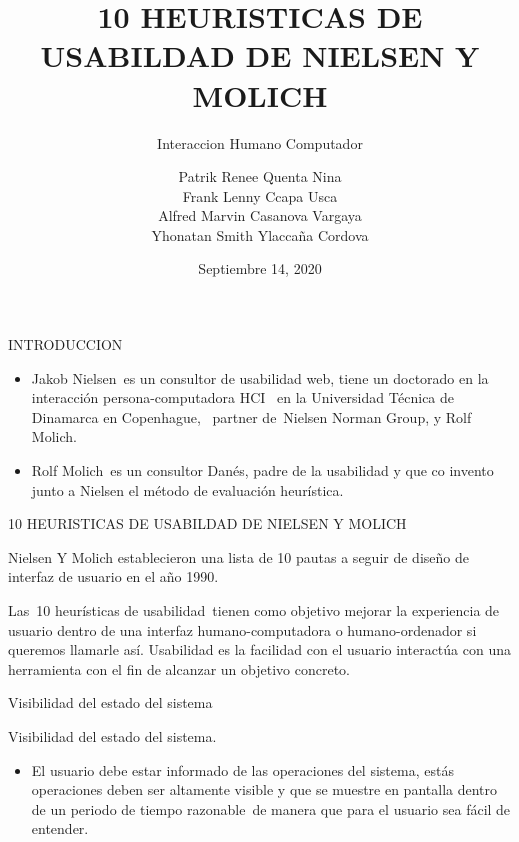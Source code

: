 \documentclass[aspectratio=169]{beamer}
\title[ICT Presentations]{10 HEURISTICAS DE USABILDAD DE NIELSEN Y MOLICH}
\subtitle{Interaccion Humano Computador}
\author[A. Jantsch]{Patrik Renee Quenta Nina\\
Frank Lenny Ccapa Usca\\
Alfred Marvin Casanova Vargaya\\
Yhonatan Smith Ylaccaña Cordova
}
\date{Septiembre 14, 2020}
\begin{document}
\begin{frame}
  \titlepage
\end{frame}      


\begin{frame}{INTRODUCCION}
  
\begin{itemize}
\item Jakob Nielsen es un consultor de usabilidad web, tiene un doctorado en la interacción persona-computadora HCI  en la Universidad Técnica de Dinamarca en Copenhague,  partner de Nielsen Norman Group, y Rolf Molich.
\item Rolf Molich es un consultor Danés, padre de la usabilidad y que co invento junto a Nielsen el método de evaluación heurística.
\end{itemize}
\end{frame}


\begin{frame}{10 HEURISTICAS DE USABILDAD DE NIELSEN Y MOLICH}

  \begin{block}{}
    Nielsen Y Molich establecieron una lista de 10 pautas a seguir de diseño de interfaz de usuario en el año 1990.
  \end{block}
  \vspace{3ex}
  \begin{block}{}
    Las 10 heurísticas de usabilidad tienen como objetivo mejorar la experiencia de usuario dentro de una interfaz humano-computadora o humano-ordenador si queremos llamarle así. Usabilidad es la facilidad con el usuario interactúa con una herramienta con el fin de alcanzar un objetivo concreto.
  \end{block}
\end{frame} 

\begin{frame}{Visibilidad del estado del sistema}
  
  \begin{block}{Visibilidad del estado del sistema.}
  \begin{itemize}    
    \item El usuario debe estar informado de las operaciones del sistema, estás operaciones deben ser altamente visible y que se muestre en pantalla dentro de un periodo de tiempo razonable de manera que para el usuario sea fácil de entender.

  \end{itemize}
  \end{block}

\end{frame}
\end{document}
